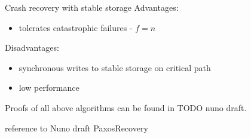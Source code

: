 Crash recovery with stable storage
Advantages:
\begin{itemize}
  \item tolerates catastrophic failures - $f = n$ 
\end{itemize}

Disadvantages:
\begin{itemize}
  \item synchronous writes to stable storage on critical path
  \item low performance
\end{itemize}


Proofs of all above algorithms can be found in TODO nuno draft.
\begin{TODO}
  reference to Nuno draft PaxosRecovery
\end{TODO}
